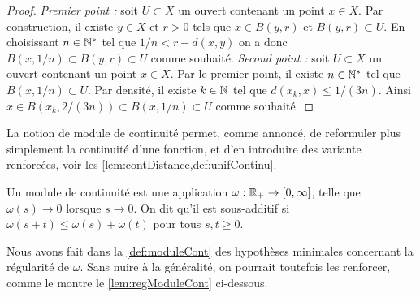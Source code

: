 \begin{proof}
	\emph{Premier point :} soit $U\subset X$ un ouvert contenant un point $x\in X$. Par construction, il existe $y\in X$ et $r>0$ tels que $x \in B(y,r)$ et $B(y,r) \subset U$. En choisissant $n \in \mathbb{N}^*$ tel que $1/n < r-d(x,y)$ on a donc $B(x,1/n) \subset B(y,r) \subset U$ comme souhaité.
	\emph{Second point :}
	soit $U\subset X$ un ouvert contenant un point $x\in X$. Par le premier point, il existe $n \in \mathbb{N}^*$ tel que $B(x,1/n) \subset U$. Par densité, il existe $k\in \mathbb{N}$ tel que $d(x_k,x) \leq 1/(3n)$. Ainsi $x \in B(x_k,2/(3n)) \subset B(x,1/n)\subset U$ comme souhaité.	
\end{proof}

La notion de module de continuité permet, comme annoncé, de reformuler plus simplement la continuité d'une fonction, et d'en introduire des variante renforcées, voir les \cref{lem:contDistance,def:unifContinu}.

\begin{definition}
\label{def:moduleCont}
%
Un module de continuité est une application $\omega : \mathbb{R}_+ \to [0,\infty]$, telle que $\omega(s) \to 0$ lorsque $s \to 0$.
On dit qu'il est sous-additif si $\omega(s+t) \leq \omega(s) + \omega(t)$ pour tous $s,t \geq 0$. 
\end{definition}
Nous avons fait dans la \cref{def:moduleCont} des hypothèses minimales concernant la régularité de $\omega$. Sans nuire à la généralité, on pourrait toutefois les renforcer, comme le montre le  \cref{lem:regModuleCont} ci-dessous. 

